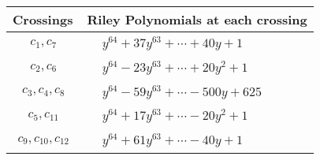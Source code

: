 \documentclass[1p]{elsarticle_modified}
\theoremstyle{definition}
\begin{document}
\begin{tabular}{m{50pt}|m{274pt}}
Crossings & \hspace{64pt}Riley Polynomials at each crossing \\
\hline $$\begin{aligned}c_{1},c_{7}\end{aligned}$$&$\begin{aligned}
&y^{64}+37 y^{63}+\cdots+40 y+1
\end{aligned}$\\
\hline $$\begin{aligned}c_{2},c_{6}\end{aligned}$$&$\begin{aligned}
&y^{64}-23 y^{63}+\cdots+20 y^2+1
\end{aligned}$\\
\hline $$\begin{aligned}c_{3},c_{4},c_{8}\end{aligned}$$&$\begin{aligned}
&y^{64}-59 y^{63}+\cdots-500 y+625
\end{aligned}$\\
\hline $$\begin{aligned}c_{5},c_{11}\end{aligned}$$&$\begin{aligned}
&y^{64}+17 y^{63}+\cdots-20 y^2+1
\end{aligned}$\\
\hline $$\begin{aligned}c_{9},c_{10},c_{12}\end{aligned}$$&$\begin{aligned}
&y^{64}+61 y^{63}+\cdots-40 y+1
\end{aligned}$\\
\hline
\end{tabular}
\vskip 2pc
\end{document}
